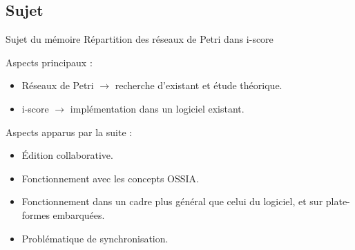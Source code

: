\subsection{Sujet}
\begin{frame}{Sujet du mémoire}
	{\large Répartition des réseaux de Petri dans i-score}
	
	Aspects principaux : 
	\begin{itemize}
		\item Réseaux de Petri $\rightarrow$ recherche d'existant et étude théorique.
		\item i-score $\rightarrow$ implémentation dans un logiciel existant.
	\end{itemize} 
	\vspace{1em}
	Aspects apparus par la suite : 
	\begin{itemize}
		\item Édition collaborative.
		\item Fonctionnement avec les concepts {OSSIA}.
		\item Fonctionnement dans un cadre plus général que celui du logiciel, et sur plate-formes embarquées.
		\item Problématique de synchronisation.
	\end{itemize}
\end{frame}